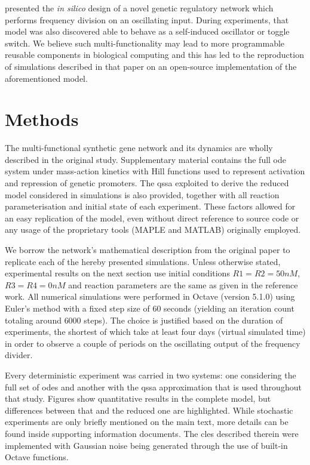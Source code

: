   \citet{multif} presented the \textit{in silico} design of a novel genetic regulatory network which performs frequency division on an oscillating input.
  During experiments, that model was also discovered able to behave as a self-induced oscillator or toggle switch.
  We believe such multi-functionality may lead to more programmable reusable components in biological computing and this has led to the reproduction of simulations described in that paper on an open-source implementation of the aforementioned model.


\section{Methods}

  The multi-functional synthetic gene network and its dynamics are wholly described in the original study.
  Supplementary material contains the full \ac{ode} system under mass-action kinetics with Hill functions used to represent activation and repression of genetic promoters.
  The \ac{qssa} exploited to derive the reduced model considered in simulations is also provided, together with all reaction parameterisation and initial state of each experiment.
  These factors allowed for an easy replication of the model, even without direct reference to source code or any usage of the proprietary tools (MAPLE and MATLAB) originally employed.

  We borrow the network's mathematical description from the original paper to replicate each of the hereby presented simulations.
  Unless otherwise stated, experimental results on the next section use initial conditions $R1 = R2 = 50nM$, $R3 = R4 = 0nM$ and reaction parameters are the same as given in the reference work.
  All numerical simulations were performed in Octave (version 5.1.0) using Euler's method with a fixed step size of $60$ seconds (yielding an iteration count totaling around $6000$ steps).
  The choice is justified based on the duration of experiments, the shortest of which take at least four days (virtual simulated time) in order to observe a couple of periods on the oscillating output of the frequency divider.

  Every deterministic experiment was carried in two systems: one considering the full set of \ac{ode}s and another with the \ac{qssa} approximation that is used throughout that study.
  Figures show quantitative results in the complete model, but differences between that and the reduced one are highlighted.
  While stochastic experiments are only briefly mentioned on the main text, more details can be found inside supporting information documents.
  The \ac{cles} described therein were implemented with Gaussian noise being generated through the use of built-in Octave functions.

